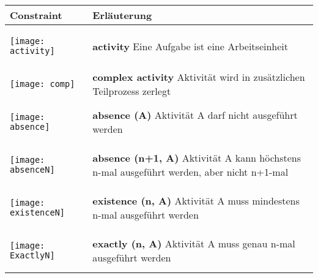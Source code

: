  \begin{longtable}{|p{}|p{}|}
\hline
\textbf{Constraint} & \textbf{Erläuterung}\\
\hline

\begin{center}
  \texttt{[image: activity]} %
  \end{center}
& \textbf{activity} \newline
Eine Aufgabe ist eine Arbeitseinheit\\
\hline

\begin{center}
  \texttt{[image: comp]} %
  \end{center}
& \textbf{complex activity} \newline
Aktivität wird in zusätzlichen Teilprozess zerlegt\\
\hline


\begin{center}
  \texttt{[image: absence]} %
  \end{center}
& \textbf{absence (A)} \newline
Aktivität A darf nicht ausgeführt werden\\



\hline
\begin{center}

  \texttt{[image: absenceN]} %
    \end{center}

& \textbf{absence (n+1, A)} \newline
Aktivität A kann höchstens n-mal ausgeführt werden, aber nicht n+1-mal\\
\hline
\begin{center}

  \texttt{[image: existenceN]} %
    \end{center}

& \textbf{existence (n, A)}\newline
Aktivität A muss mindestens n-mal ausgeführt werden\\
\hline
\begin{center}

  \texttt{[image: ExactlyN]} %
    \end{center}

& \textbf{exactly (n, A)}\newline
Aktivität A muss genau n-mal ausgeführt werden\\
\hline


\end{longtable}
